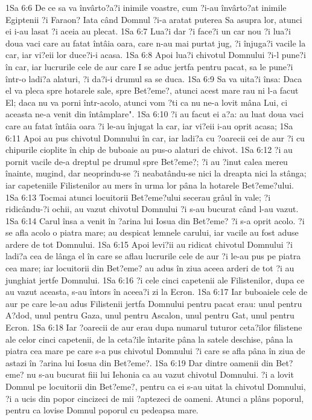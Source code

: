 1Sa 6:6  De ce sa va învârto?a?i inimile voastre, cum ?i-au învârto?at inimile Egiptenii ?i Faraon? Iata când Domnul ?i-a aratat puterea Sa asupra lor, atunci ei i-au lasat ?i aceia au plecat.
1Sa 6:7  Lua?i dar ?i face?i un car nou ?i lua?i doua vaci care au fatat întâia oara, care n-au mai purtat jug, ?i înjuga?i vacile la car, iar vi?eii lor duce?i-i acasa.
1Sa 6:8  Apoi lua?i chivotul Domnului ?i-l pune?i în car, iar lucrurile cele de aur care I se aduc jertfa pentru pacat, sa le pune?i într-o ladi?a alaturi, ?i da?i-i drumul sa se duca.
1Sa 6:9  Sa va uita?i însa: Daca el va pleca spre hotarele sale, spre Bet?eme?, atunci acest mare rau ni l-a facut El; daca nu va porni într-acolo, atunci vom ?ti ca nu ne-a lovit mâna Lui, ci aceasta ne-a venit din întâmplare".
1Sa 6:10  ?i au facut ei a?a: au luat doua vaci care au fatat întâia oara ?i le-au înjugat la car, iar vi?eii i-au oprit acasa;
1Sa 6:11  Apoi au pus chivotul Domnului în car, iar ladi?a cu ?oarecii cei de aur ?i cu chipurile cioplite în chip de buboaie au pus-o alaturi de chivot.
1Sa 6:12  ?i au pornit vacile de-a dreptul pe drumul spre Bet?eme?; ?i au ?inut calea mereu înainte, mugind, dar neoprindu-se ?i neabatându-se nici la dreapta nici la stânga; iar capeteniile Filistenilor au mers în urma lor pâna la hotarele Bet?eme?ului.
1Sa 6:13  Tocmai atunci locuitorii Bet?eme?ului secerau grâul în vale; ?i ridicându-?i ochii, au vazut chivotul Domnului ?i s-au bucurat când l-au vazut.
1Sa 6:14  Carul însa a venit în ?arina lui Iosua din Bet?eme? ?i s-a oprit acolo. ?i se afla acolo o piatra mare; au despicat lemnele carului, iar vacile au fost aduse ardere de tot Domnului.
1Sa 6:15  Apoi levi?ii au ridicat chivotul Domnului ?i ladi?a cea de lânga el în care se aflau lucrurile cele de aur ?i le-au pus pe piatra cea mare; iar locuitorii din Bet?eme? au adus în ziua aceea arderi de tot ?i au junghiat jertfe Domnului.
1Sa 6:16  ?i cele cinci capetenii ale Filistenilor, dupa ce au vazut aceasta, s-au întors în aceea?i zi la Ecron.
1Sa 6:17  Iar buboaiele cele de aur pe care le-au adus Filistenii jertfa Domnului pentru pacat erau: unul pentru A?dod, unul pentru Gaza, unul pentru Ascalon, unul pentru Gat, unul pentru Ecron.
1Sa 6:18  Iar ?oarecii de aur erau dupa numarul tuturor ceta?ilor filistene ale celor cinci capetenii, de la ceta?ile întarite pâna la satele deschise, pâna la piatra cea mare pe care s-a pus chivotul Domnului ?i care se afla pâna în ziua de astazi în ?arina lui Iosua din Bet?eme?.
1Sa 6:19  Dar dintre oamenii din Bet?eme? nu s-au bucurat fiii lui Iehonia ca au vazut chivotul Domnului. ?i a lovit Domnul pe locuitorii din Bet?eme?, pentru ca ei s-au uitat la chivotul Domnului, ?i a ucis din popor cincizeci de mii ?aptezeci de oameni. Atunci a plâns poporul, pentru ca lovise Domnul poporul cu pedeapsa mare.
